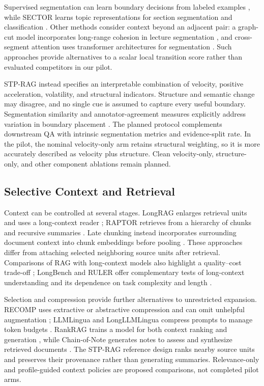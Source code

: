 \documentclass[10pt]{article}
\begin{document}
Supervised segmentation can learn boundary decisions from labeled examples \cite{Koshorek2018TextSegmentation}, while SECTOR learns topic representations for section segmentation and classification \cite{Arnold2019SectorNeural}. Other methods consider context beyond an adjacent pair: a graph-cut model incorporates long-range cohesion in lecture segmentation \cite{Malioutov2006MinimumCut}, and cross-segment attention uses transformer architectures for segmentation \cite{Lukasik2020TextSegmentation}. Such approaches provide alternatives to a scalar local transition score rather than evaluated competitors in our pilot.

STP-RAG instead specifies an interpretable combination of velocity, positive acceleration, volatility, and structural indicators. Structure and semantic change may disagree, and no single cue is assumed to capture every useful boundary. Segmentation similarity and annotator-agreement measures explicitly address variation in boundary placement \cite{Fournier2012SegmentationSimilarity}. The planned protocol complements downstream QA with intrinsic segmentation metrics and evidence-split rate. In the pilot, the nominal velocity-only arm retains structural weighting, so it is more accurately described as velocity plus structure. Clean velocity-only, structure-only, and other component ablations remain planned.

\subsection{Selective Context and Retrieval}

Context can be controlled at several stages. LongRAG enlarges retrieval units and uses a long-context reader \cite{Jiang2024LongragEnhancing}; RAPTOR retrieves from a hierarchy of chunks and recursive summaries \cite{Sarthi2024RaptorRecursive}. Late chunking instead incorporates surrounding document context into chunk embeddings before pooling \cite{Gunther2024LateChunking}. These approaches differ from attaching selected neighboring source units after retrieval. Comparisons of RAG with long-context models also highlight a quality--cost trade-off \cite{Li2024RetrievalAugmented}; LongBench and RULER offer complementary tests of long-context understanding and its dependence on task complexity and length \cite{Bai2023LongbenchBilingual,Hsieh2024RulerWhats}.

Selection and compression provide further alternatives to unrestricted expansion. RECOMP uses extractive or abstractive compression and can omit unhelpful augmentation \cite{Xu2023RecompImproving}; LLMLingua and LongLLMLingua compress prompts to manage token budgets \cite{Jiang2023LlmlinguaCompressing,Jiang2023LongllmlinguaAccelerating}. RankRAG trains a model for both context ranking and generation \cite{Yu2024RankragUnifying}, while Chain-of-Note generates notes to assess and synthesize retrieved documents \cite{Yu2023ChainofnoteEnhancing}. The STP-RAG reference design ranks nearby source units and preserves their provenance rather than generating summaries. Relevance-only and profile-guided context policies are proposed comparisons, not completed pilot arms.
\end{document}
